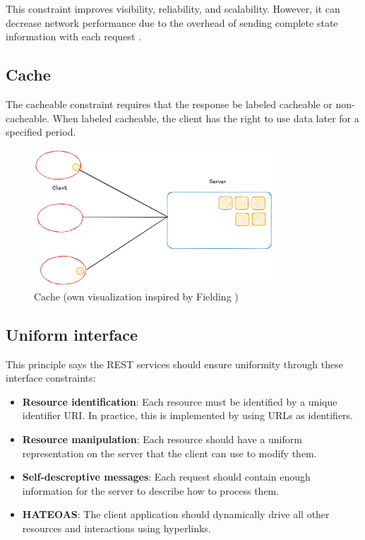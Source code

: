 This constraint improves visibility, reliability, and scalability. However, it can decrease network performance due to the overhead of sending complete state information with each request \cite[Section 5.1.3]{fielding2000}.

\subsection{Cache}

The cacheable constraint requires that the response be labeled cacheable or non-cacheable. When labeled cacheable, the client has the right to use data later for a specified period.

\begin{figure}[!h]
\centering
\includegraphics[width=0.8\textwidth, keepaspectratio]{figures/cache.png}
\caption{Cache (own visualization inspired by Fielding \cite{fielding2000})}
\label{fig:cache}
\end{figure}

\subsection{Uniform interface}
This principle says the REST services should ensure uniformity through these interface constraints:

\begin{itemize}
\item \textbf{Resource identification}: Each resource must be identified by a unique identifier URI. In practice, this is implemented by using URLs as identifiers.
\item \textbf{Resource manipulation}: Each resource should have a uniform representation on the server that the client can use to modify them.
\item \textbf{Self-descreptive messages}: Each request should contain enough information for the server to describe how to process them.
\item \textbf{HATEOAS}: The client application should dynamically drive all other resources and interactions using hyperlinks.
\end{itemize}

